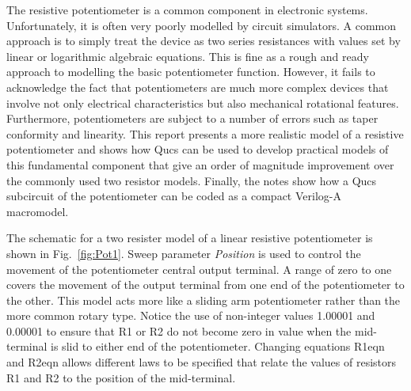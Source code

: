 %
%
%
%

\renewcommand{\thesubfigure}{\thefigure(\alph{subfigure})}
\makeatletter
  \renewcommand{\@thesubfigure}{\thesubfigure:\space}
  \renewcommand{\p@subfigure}{}
\makeatother

\renewcommand{\thesubtable}{\thetable(\alph{subtable})}
\makeatletter
  \renewcommand{\@thesubtable}{\thesubtable:\space}
  \renewcommand{\p@subtable}{}
\makeatother


The resistive potentiometer is a common component in electronic
systems. Unfortunately, it is often very poorly modelled by circuit
simulators. A common approach is to simply treat the device as two
series resistances with values set by linear or logarithmic algebraic
equations.  This is fine as a rough and ready approach to modelling
the basic potentiometer function.  However, it fails to acknowledge
the fact that potentiometers are much more complex devices that
involve not only electrical characteristics but also mechanical
rotational features.  Furthermore, potentiometers are subject to a
number of errors such as taper conformity and linearity. This report
presents a more realistic model of a resistive potentiometer and shows
how Qucs can be used to develop practical models of this fundamental
component that give an order of magnitude improvement over the
commonly used two resistor models.  Finally, the notes show how a Qucs
subcircuit of the potentiometer can be coded as a compact Verilog-A
macromodel.


The schematic for a two resister model of a linear resistive
potentiometer is shown in Fig.~\ref{fig:Pot1}. Sweep parameter
\textit{Position} is used to control the movement of the potentiometer
central output terminal. A range of zero to one covers the movement of
the output terminal from one end of the potentiometer to the
other. This model acts more like a sliding arm potentiometer rather
than the more common rotary type. Notice the use of non-integer values
1.00001 and 0.00001 to ensure that R1 or R2 do not become zero in
value when the mid-terminal is slid to either end of the
potentiometer.  Changing equations R1eqn and R2eqn allows different
laws to be specified that relate the values of resistors R1 and R2 to
the position of the mid-terminal.

